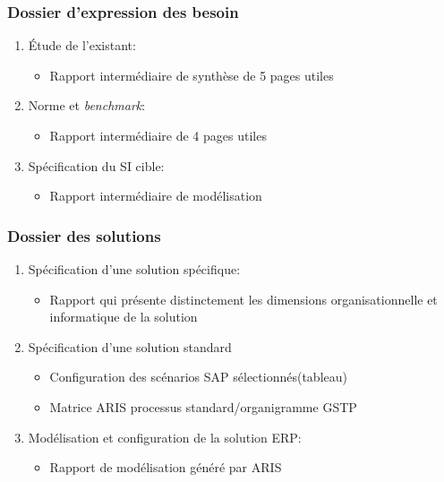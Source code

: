 \subsubsection{Dossier d'expression des besoin}
		\begin{enumerate}
			\item Étude de l'existant:
				\begin{itemize}
					\item Rapport intermédiaire de synthèse de 5 pages utiles
				\end{itemize}
			\item Norme et \textsl{benchmark}:
				\begin{itemize} 
					\item Rapport intermédiaire de 4 pages utiles
				\end{itemize}
			\item Spécification du SI cible:
				\begin{itemize} 
					\item Rapport intermédiaire de modélisation
				\end{itemize}
		\end{enumerate}

\subsubsection{Dossier des solutions}
		\begin{enumerate}
			\item Spécification d'une solution spécifique:
				\begin{itemize}
					\item Rapport qui présente distinctement les dimensions
                            organisationnelle et informatique de la solution
				\end{itemize}
			\item Spécification d'une solution standard
				\begin{itemize} 
					\item Configuration des scénarios SAP sélectionnés(tableau)
					\item Matrice ARIS processus standard/organigramme GSTP 
				\end{itemize}
			\item Modélisation et configuration de la solution ERP:
				\begin{itemize} 
					\item Rapport de modélisation généré par ARIS
				\end{itemize}
		\end{enumerate}
		
